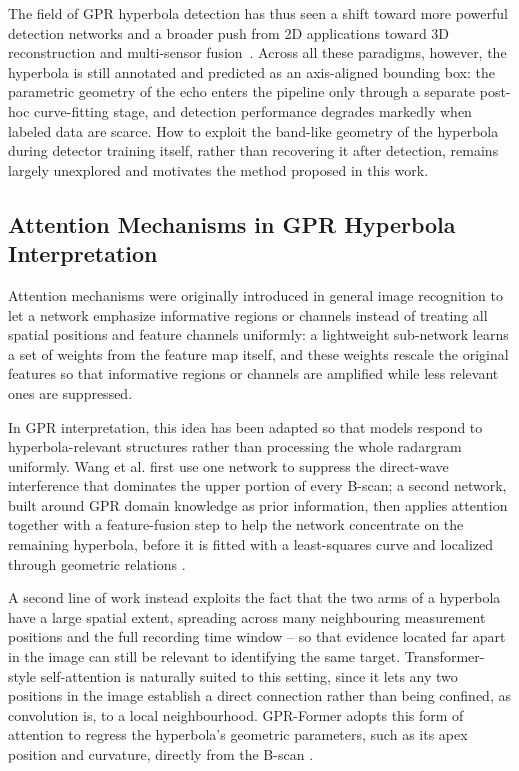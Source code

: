 \documentclass[lettersize,journal]{IEEEtran}
\begin{document}
The field of GPR hyperbola detection has thus seen a shift toward more powerful
detection networks and a broader push from 2D applications toward 3D
reconstruction and multi-sensor fusion~\cite{ma18184400,s26092708}. Across all
these paradigms, however, the hyperbola is still annotated and predicted as an
axis-aligned bounding box: the parametric geometry of the echo enters the
pipeline only through a separate post-hoc curve-fitting stage, and detection
performance degrades markedly when labeled data are scarce. How to exploit the
band-like geometry of the hyperbola during detector training itself, rather than
recovering it after detection, remains largely unexplored and motivates the
method proposed in this work.


\subsection{Attention Mechanisms in GPR Hyperbola Interpretation}

Attention mechanisms were originally introduced in general image recognition to
let a network emphasize informative regions or channels instead of treating all
spatial positions and feature channels uniformly: a lightweight sub-network
learns a set of weights from the feature map itself, and these weights rescale
the original features so that informative regions or channels are amplified
while less relevant ones are suppressed. 

In GPR interpretation, this idea has been adapted so that models respond to
hyperbola-relevant structures rather than processing the whole radargram
uniformly. Wang et al. first use one network to suppress the direct-wave
interference that dominates the upper portion of every B-scan; a second network,
built around GPR domain knowledge as prior information, then applies attention
together with a feature-fusion step to help the network concentrate on the
remaining hyperbola, before it is fitted with a least-squares curve and
localized through geometric relations \cite{Wang2025Underground}.

A second line of work instead exploits the fact that the two arms of a hyperbola
have a large spatial extent, spreading across many neighbouring measurement
positions and the full recording time window -- so that evidence located far
apart in the image can still be relevant to identifying the same target.
Transformer-style self-attention is naturally suited to this setting, since it
lets any two positions in the image establish a direct connection rather than
being confined, as convolution is, to a local neighbourhood. GPR-Former adopts
this form of attention to regress the hyperbola's geometric parameters, such as
its apex position and curvature, directly from the B-scan
\cite{jin2024gprformer}.
\end{document}
